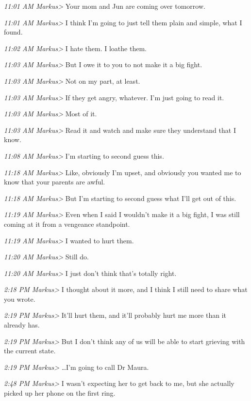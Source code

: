 {\emph{11:01 AM Markus\textgreater{}} Your mom and Jun are coming over
tomorrow.

\emph{11:01 AM Markus\textgreater{}} I think I'm going to just tell them
plain and simple, what I found.

\emph{11:02 AM Markus\textgreater{}} I hate them. I loathe them.

\emph{11:03 AM Markus\textgreater{}} But I owe it to you to not make it
a big fight.

\emph{11:03 AM Markus\textgreater{}} Not on my part, at least.

\emph{11:03 AM Markus\textgreater{}} If they get angry, whatever. I'm
just going to read it.

\emph{11:03 AM Markus\textgreater{}} Most of it.

\emph{11:03 AM Markus\textgreater{}} Read it and watch and make sure
they understand that I know.

\emph{11:08 AM Markus\textgreater{}} I'm starting to second guess this.

\emph{11:18 AM Markus\textgreater{}} Like, obviously I'm upset, and
obviously you wanted me to know that your parents are awful.

\emph{11:18 AM Markus\textgreater{}} But I'm starting to second guess
what I'll get out of this.

\emph{11:19 AM Markus\textgreater{}} Even when I said I wouldn't make it
a big fight, I was still coming at it from a vengeance standpoint.

\emph{11:19 AM Markus\textgreater{}} I wanted to hurt them.

\emph{11:20 AM Markus\textgreater{}} Still do.

\emph{11:20 AM Markus\textgreater{}} I just don't think that's totally
right.

\emph{2:18 PM Markus\textgreater{}} I thought about it more, and I think
I still need to share what you wrote.

\emph{2:19 PM Markus\textgreater{}} It'll hurt them, and it'll probably
hurt me more than it already has.

\emph{2:19 PM Markus\textgreater{}} But I don't think any of us will be
able to start grieving with the current state.

\emph{2:19 PM Markus\textgreater{}} \ldots{}I'm going to call Dr Maura.

\emph{2:48 PM Markus\textgreater{}} I wasn't expecting her to get back
to me, but she actually picked up her phone on the first ring.

}

